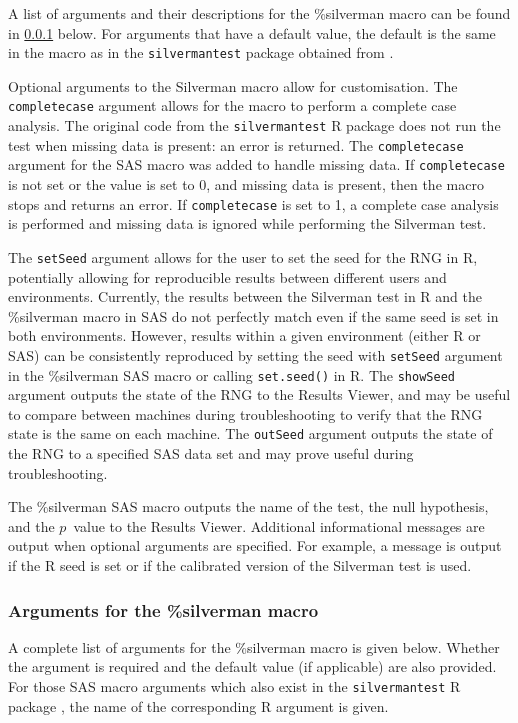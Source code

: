 \documentclass[]{interact}
\theoremstyle{plain}%
\theoremstyle{definition}
\theoremstyle{remark}
\begin{document}
A list of arguments and their descriptions for the \%silverman macro can be found in \ref{silv:args} below. For arguments that have a default value, the default is the same in the macro as in the \texttt{silvermantest} package obtained from \cite{silvermanpkg}.

Optional arguments to the Silverman macro allow for customisation. 
The \texttt{completecase} argument allows for the macro to perform a complete case analysis. The original code from the \texttt{silvermantest} R package does not run the test when missing data is present: an error is returned. The \texttt{completecase} argument for the SAS macro was added to handle missing data. If \texttt{completecase} is not set or the value is set to 0, and missing data is present, then the macro stops and returns an error. If \texttt{completecase} is set to 1, a complete case analysis is performed and missing data is ignored while performing the Silverman test.

The \texttt{setSeed} argument allows for the user to set the seed for the RNG in R, potentially allowing for reproducible results between different users and environments. Currently, the results between the Silverman test in R and the \%silverman macro in SAS do not perfectly match even if the same seed is set in both environments. However, results within a given environment (either R or SAS) can be consistently reproduced by setting the seed with \texttt{setSeed} argument in the \%silverman SAS macro or calling \texttt{set.seed()} in R. The \texttt{showSeed} argument outputs the state of the RNG to the Results Viewer, and may be useful to compare between machines during troubleshooting to verify that the RNG state is the same on each machine. The \texttt{outSeed} argument outputs the state of the RNG to a specified SAS data set and may prove useful during troubleshooting. 


The \%silverman SAS macro outputs the name of the test, the null hypothesis, and the $p$~value to the Results Viewer. Additional informational messages are output when optional arguments are specified. For example, a message is output if the R seed is set or if the calibrated version of the Silverman test is used.

\subsubsection{Arguments for the \%silverman macro}\label{silv:args}
A complete list of arguments for the \%silverman macro is given below. Whether the argument is required and the default value (if applicable) are also provided. For those SAS macro arguments which also exist in the \texttt{silvermantest} R package \cite{silvermanpkg}, the name of the corresponding R argument is given.
\end{document}
